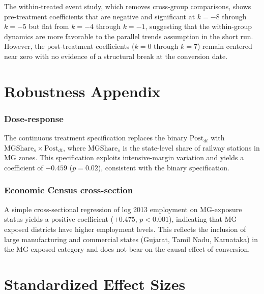 \documentclass[12pt]{article}
\begin{document}
The within-treated event study, which removes cross-group comparisons, shows pre-treatment coefficients that are negative and significant at $k = -8$ through $k = -5$ but flat from $k = -4$ through $k = -1$, suggesting that the within-group dynamics are more favorable to the parallel trends assumption in the short run. However, the post-treatment coefficients ($k = 0$ through $k = 7$) remain centered near zero with no evidence of a structural break at the conversion date.

\section{Robustness Appendix}

\subsubsection*{Dose-response} The continuous treatment specification replaces the binary $\text{Post}_{dt}$ with $\text{MGShare}_s \times \text{Post}_{dt}$, where $\text{MGShare}_s$ is the state-level share of railway stations in MG zones. This specification exploits intensive-margin variation and yields a coefficient of $-0.459$ ($p = 0.02$), consistent with the binary specification.

\subsubsection*{Economic Census cross-section} A simple cross-sectional regression of log 2013 employment on MG-exposure status yields a positive coefficient ($+0.475$, $p < 0.001$), indicating that MG-exposed districts have higher employment levels. This reflects the inclusion of large manufacturing and commercial states (Gujarat, Tamil Nadu, Karnataka) in the MG-exposed category and does not bear on the causal effect of conversion.

\section{Standardized Effect Sizes}
\label{sec:sde}


\end{document}
